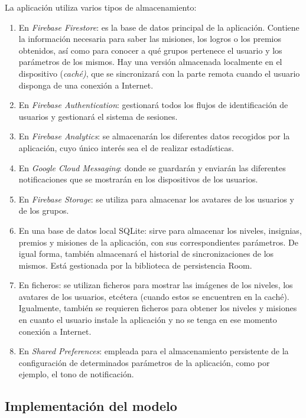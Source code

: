 \documentclass[twoside]{report}
\begin{document}
La aplicación utiliza varios tipos de almacenamiento:
\begin{enumerate}
\item En \textit{Firebase Firestore}: es la base de datos principal de la aplicación. Contiene la información necesaria para saber las misiones, los logros o los premios obtenidos, así como para conocer a qué grupos pertenece el usuario y los parámetros de los mismos. Hay una versión almacenada localmente en el dispositivo (\textit{caché)}, que se sincronizará con la parte remota cuando el usuario disponga de una conexión a Internet.
\item En \textit{Firebase Authentication}: gestionará todos los flujos de identificación de usuarios y gestionará el sistema de sesiones.
\item En \textit{Firebase Analytics}: se almacenarán los diferentes datos recogidos por la aplicación, cuyo único interés sea el de realizar estadísticas.
\item En \textit{Google Cloud Messaging}: donde se guardarán y enviarán las diferentes notificaciones que se mostrarán en los dispositivos de los usuarios.
\item En \textit{Firebase Storage}: se utiliza para almacenar los avatares de los usuarios y de los grupos.
\item En una base de datos local SQLite: sirve para almacenar los niveles, insignias, premios y misiones de la aplicación, con sus correspondientes parámetros. De igual forma, también almacenará el historial de sincronizaciones de los mismos. Está gestionada por \cite{roompersistence} la biblioteca de persistencia Room.
\item En ficheros: se utilizan ficheros para mostrar las imágenes de los niveles, los avatares de los usuarios, etcétera (cuando estos se encuentren en la caché). Igualmente, también se requieren ficheros para obtener los niveles y misiones en cuanto el usuario instale la aplicación y no se tenga en ese momento conexión a Internet.
\item En \textit{Shared Preferences}: empleada para el almacenamiento persistente de la configuración de determinados parámetros de la aplicación, como por ejemplo, el tono de notificación.
\end{enumerate}

\subsection{Implementación del modelo}
\end{document}
